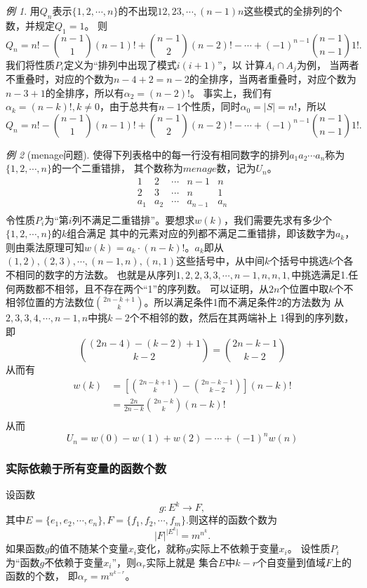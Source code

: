 \documentclass[a4paper,11pt]{article}%
\theoremstyle{remark}
\theoremstyle{remark}
\newtheorem*{example}{例}
\theoremstyle{definition}
\theoremstyle{definition}
\theoremstyle{definition}
\newcommand*{\abs}[1]{\lvert #1 \rvert}
\begin{document}
\begin{example}
    用$Q_n$表示$\{1,2,\cdots,n\}$的不出现$12,23,\cdots,(n-1)n$这些模式的全排列的个数，并规定$Q_1=1$。
    则
    \[Q_n=n!-\binom{n-1}{1}(n-1)!+\binom{n-1}{2}(n-2)!-\cdots +(-1)^{n-1}\binom{n-1}{n-1}1!.\]
    我们将性质$P_i$定义为“排列中出现了模式$i(i+1)$”，以 计算$A_i\cap A_j$为例，
    当两者不重叠时，对应的个数为$n-4+2=n-2$的全排序，当两者重叠时，对应个数为$n-3+1$的全排序，所以有$\alpha_2=(n-2)!$。
    事实上，我们有$\alpha_k=(n-k)!,k\neq 0$，由于总共有$n-1$个性质，同时$\alpha_0=\abs{S}=n!$，所以
    \[Q_n=n!-\binom{n-1}{1}(n-1)!+\binom{n-1}{2}(n-2)!-\cdots +(-1)^{n-1}\binom{n-1}{n-1}1!.\]
\end{example}
\begin{example}[menage问题]
    使得下列表格中的每一行没有相同数字的排列$a_1a_2\cdots a_n$称为$\{1,2,\cdots,n\}$的一个二重错排，
    其个数称为$menage$数，记为$U_n$。
   \[ 
    \begin{matrix}
        1 &2&\cdots & n-1&n\\
        2&3&\cdots & n&1\\
        a_1&a_2&\cdots&a_{n-1}&a_n\\
    \end{matrix}\] 
    令性质$P_i$为“第$i$列不满足二重错排”。要想求$w(k)$，我们需要先求有多少个$\{1,2,\cdots,n\}$的$k$组合满足 
    其中的元素对应的列都不满足二重错排，即该数字为$a_k$，则由乘法原理可知$w(k)=a_k\cdot (n-k)!$。$a_k$即从$(1,2),(2,3),\cdots,(n-1,n),(n,1)$这些括号中，从中间$k$个括号中挑选$k$个各不相同的数字的方法数。
    也就是从序列$1,2,2,3,3,\cdots,n-1,n,n,1,$中挑选满足1.任何两数都不相邻，且不存在两个“1”的序列数。
    可以证明，从$2n$个位置中取$k$个不相邻位置的方法数位$\binom{2n-k+1}{k}$。所以满足条件1而不满足条件2的方法数为
    从$2,3,3,4,\cdots,n-1,n$中挑$k-2$个不相邻的数，然后在其两端补上 1得到的序列数，即 
    \[\binom{(2n-4)-(k-2)+1}{k-2}=\binom{2n-k-1}{k-2}\]
    从而有 
    \[ 
        \begin{array}{rl}
    w(k)&=[\binom{2n-k+1}{k}-\binom{2n-k-1}{k-2}](n-k)!\\
    & =\frac{2n}{2n-k}\binom{2n-k}{k}(n-k)!\\
        \end{array}\]
        从而 
        \[U_n=w(0)-w(1)+w(2)-\cdots +(-1)^nw(n)\]
\end{example}
\subsubsection{实际依赖于所有变量的函数个数}
    设函数 
    \[g:E^k\rightarrow F,\]
    其中$E=\{e_1,e_2,\cdots,e_n\},F=\{f_1,f_2,\cdots,f_m\}.$则这样的函数个数为
    \[\abs{F}^{\abs{E^k}}=m^{n^k}.\]
    如果函数$g$的值不随某个变量$x_i$变化，就称$g$实际上不依赖于变量$x_i$。
    设性质$P_i$为“函数$g$不依赖于变量$x_i$”，则$\alpha_r$实际上就是 集合$E$中$k-r$个自变量到值域$F$上的函数的个数，
    即$\alpha_r = m^{n^{k-r}}$。
\end{document}
